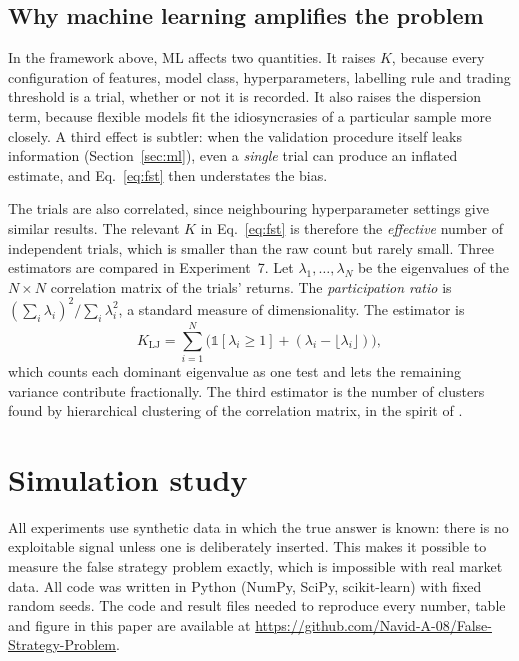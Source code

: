 \documentclass[11pt]{article}
\begin{document}
\subsection{Why machine learning amplifies the problem}
In the framework above, ML affects two quantities. It raises $K$, because every configuration of features, model class, hyperparameters, labelling rule and trading threshold is a trial, whether or not it is recorded. It also raises the dispersion term, because flexible models fit the idiosyncrasies of a particular sample more closely. A third effect is subtler: when the validation procedure itself leaks information (Section~\ref{sec:ml}), even a \emph{single} trial can produce an inflated estimate, and Eq.~\eqref{eq:fst} then understates the bias.

The trials are also correlated, since neighbouring hyperparameter settings give similar results. The relevant $K$ in Eq.~\eqref{eq:fst} is therefore the \emph{effective} number of independent trials, which is smaller than the raw count but rarely small. Three estimators are compared in Experiment~7. Let $\lambda_1,\dots,\lambda_N$ be the eigenvalues of the $N \times N$ correlation matrix of the trials' returns. The \emph{participation ratio} is $(\sum_i \lambda_i)^2 / \sum_i \lambda_i^2$, a standard measure of dimensionality. The \citet{liji2005} estimator is
\begin{equation}\label{eq:liji}
K_{\mathrm{LJ}} = \sum_{i=1}^{N} \Big( \mathbb{1}[\lambda_i \geq 1] + (\lambda_i - \lfloor \lambda_i \rfloor) \Big),
\end{equation}
which counts each dominant eigenvalue as one test and lets the remaining variance contribute fractionally. The third estimator is the number of clusters found by hierarchical clustering of the correlation matrix, in the spirit of \citet{lopezdeprado2019lewis}.

\section{Simulation study}\label{sec:sim}

All experiments use synthetic data in which the true answer is known: there is no exploitable signal unless one is deliberately inserted. This makes it possible to measure the false strategy problem exactly, which is impossible with real market data. All code was written in Python (NumPy, SciPy, scikit-learn) with fixed random seeds. The code and result files needed to reproduce every number, table and figure in this paper are available at \url{https://github.com/Navid-A-08/False-Strategy-Problem}.
\end{document}
